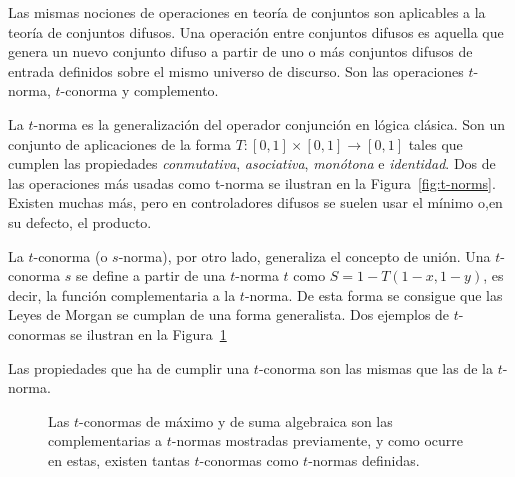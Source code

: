 Las mismas nociones de operaciones en teoría de conjuntos son aplicables a la teoría de conjuntos difusos. Una operación entre conjuntos difusos es aquella que genera un nuevo conjunto difuso a partir de uno o más conjuntos difusos de entrada definidos sobre el mismo universo de discurso. Son las operaciones $t$-norma, $t$-conorma y complemento.

La $t$-norma es la generalización del operador conjunción en lógica clásica. Son un conjunto de aplicaciones de la forma $T: [0, 1] \times [0, 1] \rightarrow [0, 1]$ tales que cumplen las propiedades \textit{conmutativa}, \textit{asociativa}, \textit{monótona} e \textit{identidad}. Dos de las operaciones más usadas como t-norma se ilustran en la Figura~\ref{fig:t-norms}. Existen muchas más, pero en controladores difusos se suelen usar el mínimo o,en su defecto, el producto.

La $t$-conorma (o $s$-norma), por otro lado, generaliza el concepto de unión. Una $t$-conorma $s$ se define a partir de una $t$-norma $t$ como $S = 1 - T(1-x, 1-y)$, es decir, la función complementaria a la $t$-norma. De esta forma se consigue que las Leyes de Morgan se cumplan de una forma generalista. Dos ejemplos de $t$-conormas se ilustran en la Figura~\ref{fig:t-conorms}

Las propiedades que ha de cumplir una $t$-conorma son las mismas que las de la $t$-norma.

\begin{figure}[t]
	\centering
	\caption[$t$-normas del máximo y de la suma algebraica.]{Las $t$-conormas de máximo y de suma algebraica son las complementarias a $t$-normas mostradas previamente, y como ocurre en estas, existen tantas $t$-conormas como $t$-normas definidas.}
	\label{fig:t-conorms}
\end{figure}

